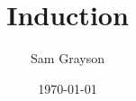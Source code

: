 \documentclass{beamer}
\title{Induction}
\author{Sam Grayson}
\institute{Cool school}
\date{\today}
\begin{document}
 
\frame{
\titlepage
}
 





\end{document}
